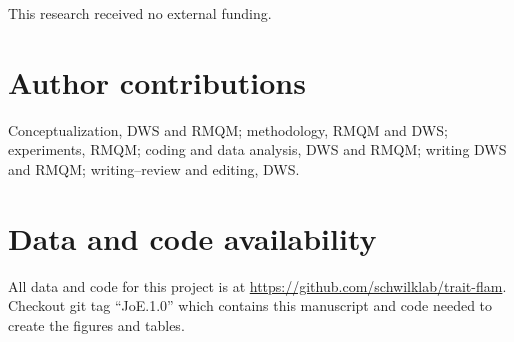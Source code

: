 \documentclass[letterpaper,12pt]{article}
\begin{document}
This research received no external funding.

\section*{Author contributions}

Conceptualization, DWS and RMQM; methodology, RMQM and DWS; experiments, RMQM;
coding and data analysis, DWS and RMQM; writing DWS and RMQM; writing--review
and editing, DWS.

\section*{Data and code availability}
All data and code for this project is at
\url{https://github.com/schwilklab/trait-flam}. Checkout git tag ``JoE.1.0''
which contains this manuscript and code needed to create the figures and
tables.

\newpage




\end{document}
